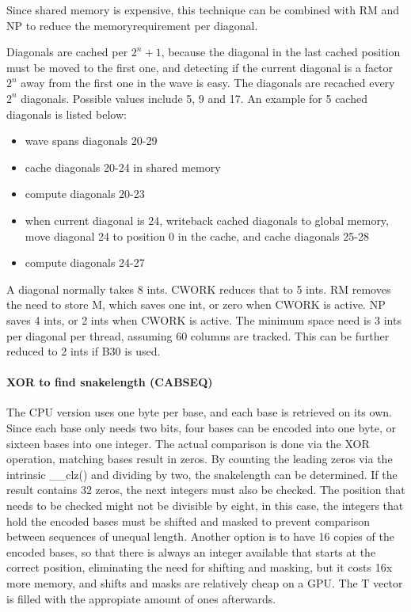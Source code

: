 \documentclass[../main/thesis.tex]{subfiles}
\begin{document}

Since shared memory is expensive, this technique can be combined with RM and NP to reduce the memoryrequirement per diagonal.

Diagonals are cached per $2^n+1$, because the diagonal in the last cached position must be moved to the first one, and detecting if the current diagonal is a factor $2^n$ away from the first one in the wave is easy.
The diagonals are recached every $2^n$ diagonals.
Possible values include 5, 9 and 17.
An example for 5 cached diagonals is listed below:

\begin{itemize}
\item wave spans diagonals 20-29
\item cache diagonals 20-24 in shared memory
\item compute diagonals 20-23
\item when current diagonal is 24, writeback cached diagonals to global memory, move diagonal 24 to position 0 in the cache, and cache diagonals 25-28
\item compute diagonals 24-27
\end{itemize}

A diagonal normally takes 8 ints.
CWORK reduces that to 5 ints.
RM removes the need to store M, which saves one int, or zero when CWORK is active.
NP saves 4 ints, or 2 ints when CWORK is active.
The minimum space need is 3 ints per diagonal per thread, assuming 60 columns are tracked.
This can be further reduced to 2 ints if B30 is used.


\paragraph{XOR to find snakelength (CABSEQ)}
The CPU version uses one byte per base, and each base is retrieved on its own.
Since each base only needs two bits, four bases can be encoded into one byte, or sixteen bases into one integer.
The actual comparison is done via the XOR operation, matching bases result in zeros.
By counting the leading zeros via the intrinsic \_\_clz() \cite{CUDA_math} and dividing by two, the snakelength can be determined.
If the result contains 32 zeros, the next integers must also be checked.
The position that needs to be checked might not be divisible by eight, in this case, the integers that hold the encoded bases must be shifted and masked to prevent comparison between sequences of unequal length.
Another option is to have 16 copies of the encoded bases, so that there is always an integer available that starts at the correct position, eliminating the need for shifting and masking, but it costs 16x more memory, and shifts and masks are relatively cheap on a GPU.
The T vector is filled with the appropiate amount of ones afterwards.
\end{document}
